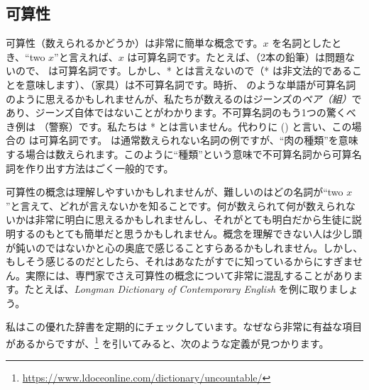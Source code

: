 \subsection{可算性}\label{sec:count}

可算性（数えられるかどうか）は非常に簡単な概念です。$x$ を名詞としたとき、\enquote{two $x$}と言えれば、$x$ は可算名詞です。たとえば、（2本の鉛筆）は問題ないので、 は可算名詞です。しかし、* とは言えないので（* は非文法的であることを意味します）、（家具）は不可算名詞です。時折、 のような単語が可算名詞のように思えるかもしれませんが、私たちが数えるのはジーンズの\emph{ペア（組）}であり、ジーンズ自体ではないことがわかります。不可算名詞のもう1つの驚くべき例は （警察）です。私たちは * とは言いません。代わりに  ()  と言い、この場合の  は可算名詞です。 は通常数えられない名詞の例ですが、\enquote{肉の種類}を意味する場合は数えられます。このように\enquote{種類}という意味で不可算名詞から可算名詞を作り出す方法はごく一般的です。

可算性の概念は理解しやすいかもしれませんが、難しいのはどの名詞が\enquote{two $x$}と言えて、どれが言えないかを知ることです。何が数えられて何が数えられないかは非常に明白に思えるかもしれませんし、それがとても明白だから生徒に説明するのもとても簡単だと思うかもしれません。概念を理解できない人は少し頭が鈍いのではないかと心の奥底で感じることすらあるかもしれません。しかし、もしそう感じるのだとしたら、それはあなたがすでに知っているからにすぎません。実際には、専門家でさえ可算性の概念について非常に混乱することがあります。たとえば、\textit{Longman Dictionary of Contemporary English} を例に取りましょう。

私はこの優れた辞書を定期的にチェックしています。なぜなら非常に有益な項目があるからですが、\footnote{\url{https://www.ldoceonline.com/dictionary/uncountable/}} を引いてみると、次のような定義が見つかります。

